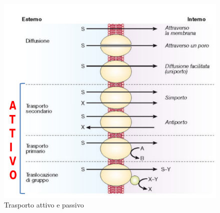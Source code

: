 \documentclass[11pt]{book}
\begin{document}
\clearpage
\begin{figure}[htp]
\centering
\includegraphics[scale=0.5]{img/Trasporto attivo e passivo.png}
\caption{Trasporto attivo e passivo}
\label{}
\end{figure}
\end{document}
